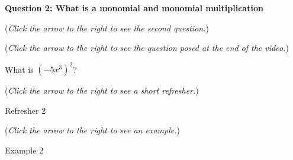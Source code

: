 \documentclass{ximera}
\begin{document}
\textbf{Question 2: What is a monomial and monomial multiplication}
\begin{question}
\begin{flushright}
{\color{blue}(\emph{Click the arrow to the right to see the second question.})}
\end{flushright}
\begin{center}
\begin{expandable}
{\color{blue}(\emph{Click the arrow to the right to see the  question
posed at the end of the video.})}
\begin{expandable}
What is $(-5x^3)^2$?
\begin{multipleChoice}
\end{multipleChoice}
\begin{flushright}
{\color{blue}(\emph{Click the arrow to the right to see a short refresher.})}
\end{flushright}
\begin{expandable}
Refresher 2
\end{expandable}
\begin{flushright}
{\color{blue}(\emph{Click the arrow to the right to see an example.})}
\end{flushright}
\begin{expandable}
Example 2
\end{expandable}
\end{expandable}
\end{expandable}
\end{center}
\end{question}
\end{document}
